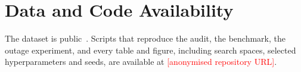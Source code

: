 \documentclass[conference]{IEEEtran}
\newcommand{\tbd}[1]{\textcolor{red}{#1}}
\begin{document}
\section*{Data and Code Availability}
The dataset is public~\cite{rao2020kaggle}. Scripts that reproduce the audit, the benchmark,
the outage experiment, and every table and figure, including search spaces, selected
hyperparameters and seeds, are available at \tbd{[anonymised repository URL]}.



\end{document}
